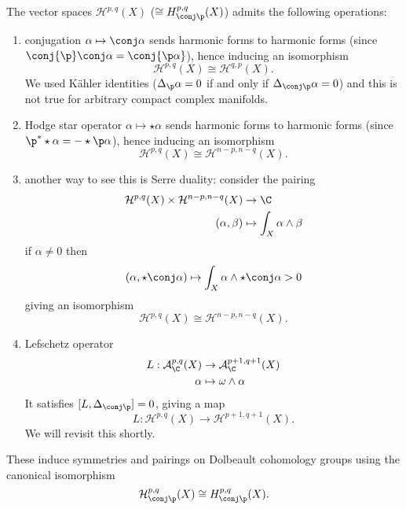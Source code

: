 \documentclass[a4paper]{article}
\newcommand{\w}{\wedge} %
\begin{document}
\begin{remark}
  The vector spaces \(\mathcal H^{p, q}(X)\) (\(\cong H_{\conj \p}^{p, q}(X)\)) admits the following operations:
  \begin{enumerate}
  \item conjugation \(\alpha \mapsto \conj \alpha\) sends harmonic forms to harmonic forms (since \(\conj{\p} \conj \alpha = \conj{\p \alpha}\)), hence inducing an isomorphism
    \[
      \mathcal H^{p, q}(X) \cong \mathcal H^{q, p}(X).
    \]
    We used Kähler identities (\(\Delta_\p \alpha = 0\) if and only if \(\Delta_{\conj \p} \alpha = 0\)) and this is not true for arbitrary compact complex manifolds.
  \item Hodge star operator \(\alpha \mapsto \star \alpha\) sends harmonic forms to harmonic forms (since \(\p^* \star \alpha = - \star \p \alpha\)), hence inducing an isomorphism
    \[
      \mathcal H^{p, q}(X) \cong \mathcal H^{n - p, n - q}(X).
    \]
  \item another way to see this is Serre duality: consider the pairing
    \begin{align*}
      \mathcal H^{p, q}(X) \times \mathcal H^{n - p, n - q}(X) &\to \C \\
      (\alpha, \beta) &\mapsto \int_X \alpha \w \beta
    \end{align*}
    if \(\alpha \neq 0\) then
    \[
      (\alpha, \star \conj \alpha) \mapsto \int_X \alpha \w \star \conj \alpha > 0
    \]
    giving an isomorphism
    \[
      \mathcal H^{p, q}(X) \cong \mathcal H^{n - p, n - q}(X).
    \]
  \item Lefschetz operator
    \begin{align*}
      L: \mathcal A_\C^{p, q}(X) &\to \mathcal A_\C^{p + 1, q + 1}(X) \\
      \alpha &\mapsto \omega \w \alpha
    \end{align*}
    It satisfies \([L, \Delta_{\conj \p}] = 0\), giving a map
    \[
      L: \mathcal H^{p, q}(X) \to \mathcal H^{p + 1, q + 1}(X).
    \]
    We will revisit this shortly.
  \end{enumerate}
  These induce symmetries and pairings on Dolbeault cohomology groups using the canonical isomorphism
  \[
    \mathcal H_{\conj \p}^{p, q}(X) \cong H_{\conj \p}^{p, q}(X).
  \]
\end{remark}
\end{document}
